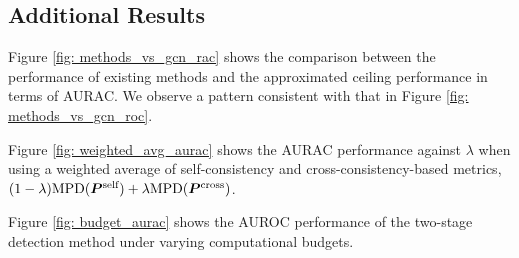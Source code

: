 \subsection{Additional Results}\label{apdx: additional_exp}

Figure \ref{fig: methods_vs_gcn_rac} shows the comparison between the performance of existing methods and the approximated ceiling performance in terms of AURAC. We observe a pattern consistent with that in Figure \ref{fig: methods_vs_gcn_roc}.


Figure \ref{fig: weighted_avg_aurac} shows the AURAC performance against $\lambda$ when using a weighted average of self-consistency and cross-consistency-based metrics, $(1-\lambda) \text{MPD}({\bm{P}}^{\text{self}}) + \lambda \text{MPD}({\bm{P}}^{\text{cross}})$.

Figure \ref{fig: budget_aurac} shows the AUROC performance of the two-stage detection method under varying computational budgets.

\begin{figure*}[!t]
    \centering

    \caption{Comparison between the performance of existing methods and the approximated ceiling performance on the SQuAD ((a)–(c)) and TriviaQA ((d)–(f)) datasets. Here, performance is measured in terms of AURAC. We observe a pattern consistent with the discussion in Figure \ref{fig: methods_vs_gcn_roc}. }
    \label{fig: methods_vs_gcn_rac}
\end{figure*}


